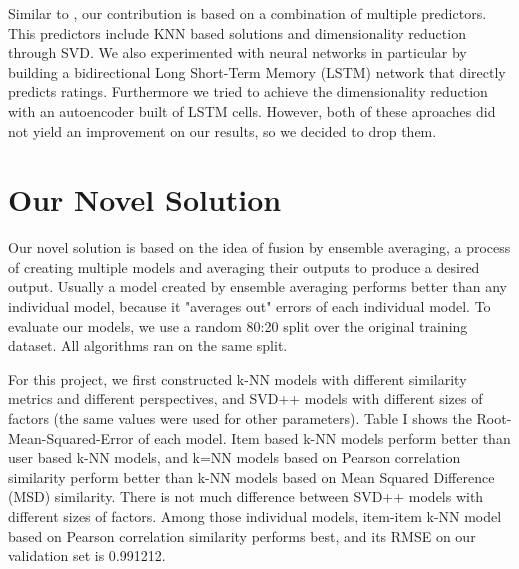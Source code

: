 \documentclass[10pt,conference,compsocconf]{IEEEtran}
\begin{document}
Similar to \cite{paterek}, our contribution is based on a combination of multiple predictors. This predictors include KNN based solutions and dimensionality reduction through SVD. We also experimented with neural networks in particular by building a bidirectional Long Short-Term Memory (LSTM) network that directly predicts ratings. Furthermore we tried to achieve the dimensionality reduction with an autoencoder built of LSTM cells. However, both of these aproaches did not yield an improvement on our results, so we decided to drop them.

\section{Our Novel Solution}
Our novel solution is based on the idea of fusion by ensemble averaging, a process of creating multiple models and averaging their outputs to produce a desired output\cite{ariel}. Usually a model created by ensemble averaging performs better than any individual model, because it "averages out" errors of each individual model. To evaluate our models, we use a random 80:20 split over the original training dataset. All algorithms ran on the same split. 

For this project, we first constructed k-NN models with different similarity metrics and different perspectives, and SVD++ models with different sizes of factors (the same values were used for other parameters). Table I shows the Root-Mean-Squared-Error of each model. Item based k-NN models perform better than user based k-NN models, and k=NN models based on Pearson correlation similarity perform better than k-NN models based on Mean Squared Difference (MSD) similarity. There is not much difference between SVD++ models with different sizes of factors. Among those individual models, item-item k-NN model based on Pearson correlation similarity performs best, and its RMSE on our validation set is 0.991212.
\end{document}
